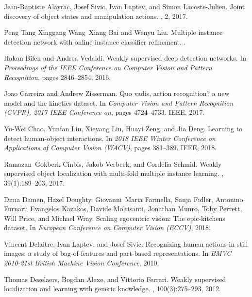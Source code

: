 \documentclass[10pt,twocolumn,letterpaper]{article}
\begin{document}
{\small
\begin{thebibliography}{10}\itemsep=-1pt

Jean-Baptiste Alayrac, Josef Sivic, Ivan Laptev, and Simon Lacoste-Julien.
\newblock Joint discovery of object states and manipulation actions.
, 2, 2017.

Peng Tang Xinggang Wang~Xiang Bai and Wenyu Liu.
\newblock Multiple instance detection network with online instance classifier
  refinement.
.

Hakan Bilen and Andrea Vedaldi.
\newblock Weakly supervised deep detection networks.
\newblock In {\em Proceedings of the IEEE Conference on Computer Vision and
  Pattern Recognition}, pages 2846--2854, 2016.

Joao Carreira and Andrew Zisserman.
\newblock Quo vadis, action recognition? a new model and the kinetics dataset.
\newblock In {\em Computer Vision and Pattern Recognition (CVPR), 2017 IEEE
  Conference on}, pages 4724--4733. IEEE, 2017.

Yu-Wei Chao, Yunfan Liu, Xieyang Liu, Huayi Zeng, and Jia Deng.
\newblock Learning to detect human-object interactions.
\newblock In {\em 2018 IEEE Winter Conference on Applications of Computer
  Vision (WACV)}, pages 381--389. IEEE, 2018.

Ramazan~Gokberk Cinbis, Jakob Verbeek, and Cordelia Schmid.
\newblock Weakly supervised object localization with multi-fold multiple
  instance learning.
,
  39(1):189--203, 2017.

Dima Damen, Hazel Doughty, Giovanni~Maria Farinella, Sanja Fidler, Antonino
  Furnari, Evangelos Kazakos, Davide Moltisanti, Jonathan Munro, Toby Perrett,
  Will Price, and Michael Wray.
\newblock Scaling egocentric vision: The epic-kitchens dataset.
\newblock In {\em European Conference on Computer Vision (ECCV)}, 2018.

Vincent Delaitre, Ivan Laptev, and Josef Sivic.
\newblock Recognizing human actions in still images: a study of bag-of-features
  and part-based representations.
\newblock In {\em BMVC 2010-21st British Machine Vision Conference}, 2010.

Thomas Deselaers, Bogdan Alexe, and Vittorio Ferrari.
\newblock Weakly supervised localization and learning with generic knowledge.
, 100(3):275--293,
  2012.


\end{thebibliography}}
\end{document}
